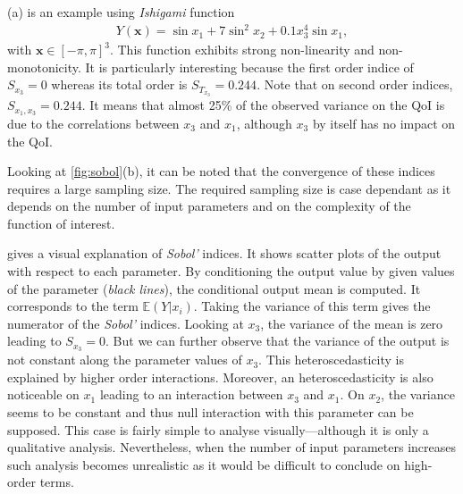 (a) is an example using \textit{Ishigami} function~\cite{ishigami1990}
\begin{align}
Y(\mathbf{x}) = \sin x_1 + 7 \sin^2 x_2 + 0.1 x_3^4 \sin x_1,
\end{align}
\noindent with $\mathbf{x} \in [-\pi, \pi]^3$. This function exhibits strong non-linearity and non-monotonicity. It is particularly interesting because the first order indice of $S_{x_3} = 0$ whereas its total order is $S_{T_{x_3}} = 0.244$. Note that on second order indices, $S_{x_1,x_3} = 0.244$. It means that almost 25\% of the observed variance on the QoI is due to the correlations between $x_3$ and $x_1$, although $x_3$ by itself has no impact on the QoI.

Looking at \cref{fig:sobol}(b), it can be noted that the convergence of these indices requires a large sampling size. The required sampling size is case dependant as it depends on the number of input parameters and on the complexity of the function of interest.

 gives a visual explanation of \emph{Sobol'} indices. It shows scatter plots of the output with respect to each parameter. By conditioning the output value by given values of the parameter (\emph{black lines}), the conditional output mean is computed. It corresponds to the term $\mathbb{E}(Y|x_i)$. Taking the variance of this term gives the numerator of the \emph{Sobol'} indices. Looking at $x_3$, the variance of the mean is zero leading to $S_{x_3} = 0$. But we can further observe that the variance of the output is not constant along the parameter values of $x_3$. This heteroscedasticity is explained by higher order interactions. Moreover, an heteroscedasticity is also noticeable on $x_1$ leading to an interaction between $x_3$ and $x_1$. On $x_2$, the variance seems to be constant and thus null interaction with this parameter can be supposed. This case is fairly simple to analyse visually---although it is only a qualitative analysis. Nevertheless, when the number of input parameters increases such analysis becomes unrealistic as it would be difficult to conclude on high-order terms.

